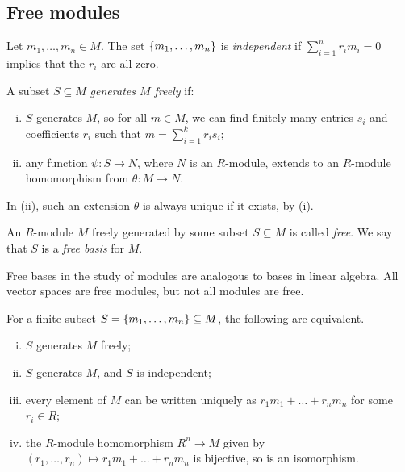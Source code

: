 \subsection{Free modules}
\begin{definition}
	Let \( m_1, \dots, m_n \in M \).
	The set \( \qty{m_1, \dots, m_n} \) is \textit{independent} if \( \sum_{i=1}^n r_i m_i = 0 \) implies that the \( r_i \) are all zero.
\end{definition}
\begin{definition}
	A subset \( S \subseteq M \) \textit{generates \( M \) freely} if:
	\begin{enumerate}[(i)]
		\item \( S \) generates \( M \), so for all \( m \in M \), we can find finitely many entries \( s_i \) and coefficients \( r_i \) such that \( m = \sum_{i=1}^k r_i s_i \);
		\item any function \( \psi \colon S \to N \), where \( N \) is an \( R \)-module, extends to an \( R \)-module homomorphism from \( \theta \colon M \to N \).
	\end{enumerate}
\end{definition}
\begin{remark}
	In (ii), such an extension \( \theta \) is always unique if it exists, by (i).
\end{remark}
\begin{definition}
	An \( R \)-module \( M \) freely generated by some subset \( S \subseteq M \) is called \textit{free}.
	We say that \( S \) is a \textit{free basis} for \( M \).
\end{definition}
\begin{remark}
	Free bases in the study of modules are analogous to bases in linear algebra.
	All vector spaces are free modules, but not all modules are free.
\end{remark}
\begin{proposition}
	For a finite subset \( S = \qty{m_1, \dots, m_n} \subseteq M \), the following are equivalent.
	\begin{enumerate}[(i)]
		\item \( S \) generates \( M \) freely;
		\item \( S \) generates \( M \), and \( S \) is independent;
		\item every element of \( M \) can be written uniquely as \( r_1 m_1 + \dots + r_n m_n \) for some \( r_i \in R \);
		\item the \( R \)-module homomorphism \( R^n \to M \) given by \( (r_1, \dots, r_n) \mapsto r_1 m_1 + \dots + r_n m_n \) is bijective, so is an isomorphism.
	\end{enumerate}
\end{proposition}
